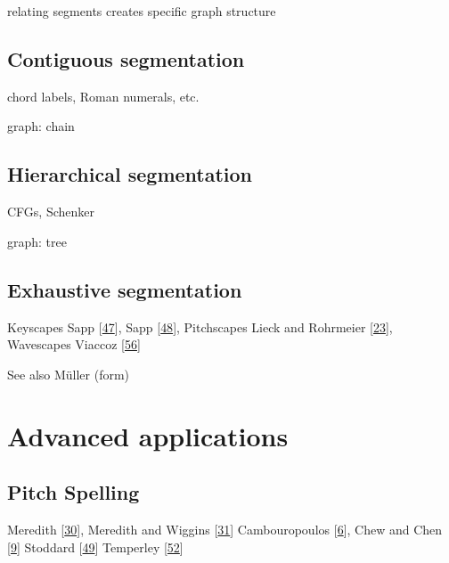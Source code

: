 \documentclass[letterpaper,10pt,english]{sphinxmanual}
\begin{document}
\sphinxAtStartPar
relating segments creates specific graph structure


\section{Contiguous segmentation}
\label{\detokenize{5_segmentation:contiguous-segmentation}}
\sphinxAtStartPar
chord labels, Roman numerals, etc.

\sphinxAtStartPar
graph: chain


\section{Hierarchical segmentation}
\label{\detokenize{5_segmentation:hierarchical-segmentation}}
\sphinxAtStartPar
CFGs, Schenker

\sphinxAtStartPar
graph: tree


\section{Exhaustive segmentation}
\label{\detokenize{5_segmentation:exhaustive-segmentation}}
\sphinxAtStartPar
Keyscapes Sapp {[}\hyperlink{cite.8_bibliography:id27}{47}{]}, Sapp {[}\hyperlink{cite.8_bibliography:id28}{48}{]},
Pitchscapes Lieck and Rohrmeier {[}\hyperlink{cite.8_bibliography:id26}{23}{]},
Wavescapes Viaccoz  {[}\hyperlink{cite.8_bibliography:id41}{56}{]}

\sphinxAtStartPar
See also Müller (form)


\chapter{Advanced applications}
\label{\detokenize{6_advanced:advanced-applications}}\label{\detokenize{6_advanced::doc}}

\section{Pitch Spelling}
\label{\detokenize{6_advanced:pitch-spelling}}\label{\detokenize{6_advanced:id1}}
\sphinxAtStartPar
Meredith {[}\hyperlink{cite.8_bibliography:id21}{30}{]}, Meredith and Wiggins {[}\hyperlink{cite.8_bibliography:id20}{31}{]}
Cambouropoulos {[}\hyperlink{cite.8_bibliography:id22}{6}{]}, Chew and Chen {[}\hyperlink{cite.8_bibliography:id23}{9}{]}
Stoddard  {[}\hyperlink{cite.8_bibliography:id24}{49}{]}
Temperley {[}\hyperlink{cite.8_bibliography:id25}{52}{]}
\end{document}
